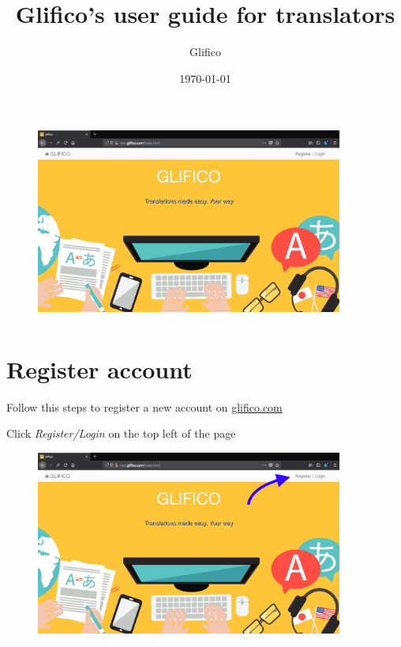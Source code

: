 \documentclass[11 pt, a4paper]{article}
\author{Glifico}
\date{\today}
\title{Glifico's user guide for translators}
\begin{document}
\maketitle
\begin{figure}[htb!]
\centering
\includegraphics[width=0.9\textwidth]{home.png}
\end{figure}

\newpage
\thispagestyle{empty}
\tableofcontents

\clearpage
\section{Register account}
Follow this steps to register a new account on \url{glifico.com}

Click \textit{Register/Login} on the top left of the page
\begin{figure}[H]
\centering
\includegraphics[width=0.9\textwidth]{translator_register0.png}
\end{figure}
\end{document}
